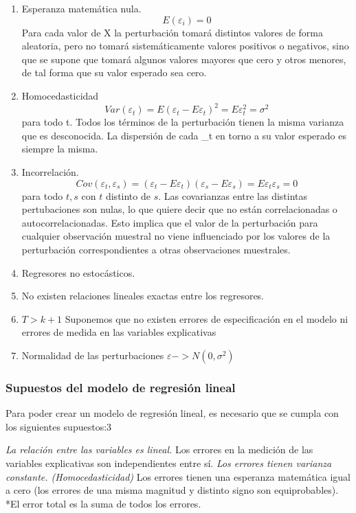 \documentclass{article}
\begin{document}
\begin{enumerate}
\def\labelenumi{\arabic{enumi}.}
\item
  Esperanza matemática nula. \[E(\varepsilon_i) = 0\] Para cada valor de
  X la perturbación tomará distintos valores de forma aleatoria, pero no
  tomará sistemáticamente valores positivos o negativos, sino que se
  supone que tomará algunos valores mayores que cero y otros menores, de
  tal forma que su valor esperado sea cero.
\item
  Homocedasticidad
  \[Var(\varepsilon_t) = E(\varepsilon_t - E \varepsilon_t)^2 = E \varepsilon_t^2 = \sigma^2\]
  para todo t. Todos los términos de la perturbación tienen la misma
  varianza que es desconocida. La dispersión de cada \varepsilon\_t en
  torno a su valor esperado es siempre la misma.
\item
  Incorrelación.
  \[Cov(\varepsilon_t,\varepsilon_s ) = (\varepsilon_t - E \varepsilon_t) (\varepsilon_s - E \varepsilon_s) = E \varepsilon_t \varepsilon_s = 0 \]
  para todo $t,s$ con $t$ distinto de $s$. Las covarianzas entre las
  distintas pertubaciones son nulas, lo que quiere decir que no están
  correlacionadas o autocorrelacionadas. Esto implica que el valor de la
  perturbación para cualquier observación muestral no viene influenciado
  por los valores de la perturbación correspondientes a otras
  observaciones muestrales.
\item
  Regresores no estocásticos.
\item
  No existen relaciones lineales exactas entre los regresores.
\item
  $T > k + 1$ Suponemos que no existen errores de especificación en el
  modelo ni errores de medida en las variables explicativas
\item
  Normalidad de las perturbaciones $\varepsilon -> N(0, \sigma^2 )$
\end{enumerate}

\subsubsection{Supuestos del modelo de regresión
lineal}\label{supuestos-del-modelo-de-regresiuxf3n-lineal}

Para poder crear un modelo de regresión lineal, es necesario que se
cumpla con los siguientes supuestos:3

\emph{La relación entre las variables es lineal. }Los errores en la
medición de las variables explicativas son independientes entre sí.
\emph{Los errores tienen varianza constante. (Homocedasticidad) }Los
errores tienen una esperanza matemática igual a cero (los errores de una
misma magnitud y distinto signo son equiprobables). *El error total es
la suma de todos los errores.
\end{document}
